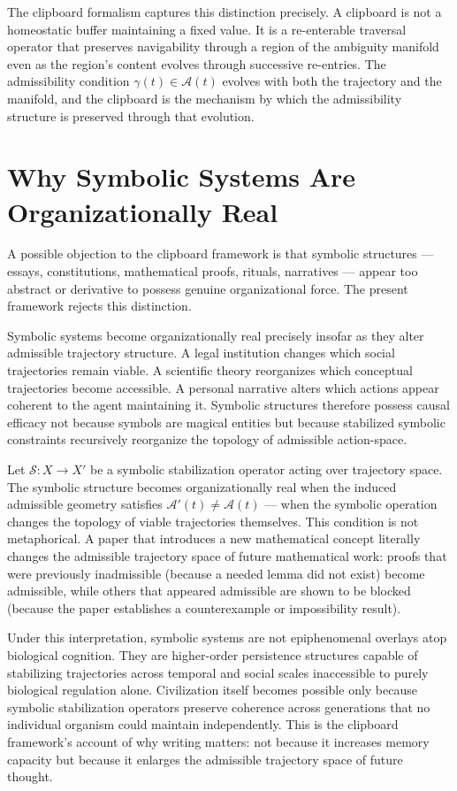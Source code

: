 \documentclass[12pt,oneside]{book}
\theoremstyle{plain}
\theoremstyle{definition}
\theoremstyle{plain}
\begin{document}
The clipboard formalism captures this distinction precisely. A clipboard is not a homeostatic buffer maintaining a fixed value. It is a re-enterable traversal operator that preserves navigability through a region of the ambiguity manifold even as the region's content evolves through successive re-entries. The admissibility condition $\gamma(t) \in \mathcal{A}(t)$ evolves with both the trajectory and the manifold, and the clipboard is the mechanism by which the admissibility structure is preserved through that evolution.

\section{Why Symbolic Systems Are Organizationally Real}

A possible objection to the clipboard framework is that symbolic structures — essays, constitutions, mathematical proofs, rituals, narratives — appear too abstract or derivative to possess genuine organizational force. The present framework rejects this distinction.

Symbolic systems become organizationally real precisely insofar as they alter admissible trajectory structure. A legal institution changes which social trajectories remain viable. A scientific theory reorganizes which conceptual trajectories become accessible. A personal narrative alters which actions appear coherent to the agent maintaining it. Symbolic structures therefore possess causal efficacy not because symbols are magical entities but because stabilized symbolic constraints recursively reorganize the topology of admissible action-space.

Let $\mathcal{S} : X \to X'$ be a symbolic stabilization operator acting over trajectory space. The symbolic structure becomes organizationally real when the induced admissible geometry satisfies $\mathcal{A}'(t) \neq \mathcal{A}(t)$ — when the symbolic operation changes the topology of viable trajectories themselves. This condition is not metaphorical. A paper that introduces a new mathematical concept literally changes the admissible trajectory space of future mathematical work: proofs that were previously inadmissible (because a needed lemma did not exist) become admissible, while others that appeared admissible are shown to be blocked (because the paper establishes a counterexample or impossibility result).

Under this interpretation, symbolic systems are not epiphenomenal overlays atop biological cognition. They are higher-order persistence structures capable of stabilizing trajectories across temporal and social scales inaccessible to purely biological regulation alone. Civilization itself becomes possible only because symbolic stabilization operators preserve coherence across generations that no individual organism could maintain independently. This is the clipboard framework's account of why writing matters: not because it increases memory capacity but because it enlarges the admissible trajectory space of future thought.
\end{document}
